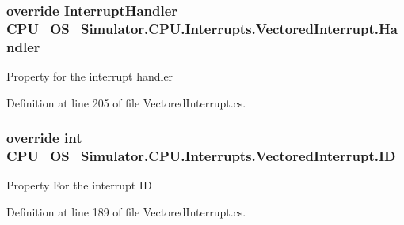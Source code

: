 \hypertarget{class_c_p_u___o_s___simulator_1_1_c_p_u_1_1_interrupts_1_1_vectored_interrupt_a0eb71f1e9f97cd4730fc8382e4ff8843}{}
\subsubsection[{Handler}]{\setlength{\rightskip}{0pt plus 5cm}override {\bf Interrupt\+Handler} C\+P\+U\+\_\+\+O\+S\+\_\+\+Simulator.\+C\+P\+U.\+Interrupts.\+Vectored\+Interrupt.\+Handler\hspace{0.3cm}{\ttfamily [get]}}\label{class_c_p_u___o_s___simulator_1_1_c_p_u_1_1_interrupts_1_1_vectored_interrupt_a0eb71f1e9f97cd4730fc8382e4ff8843}


Property for the interrupt handler 



Definition at line 205 of file Vectored\+Interrupt.\+cs.

\hypertarget{class_c_p_u___o_s___simulator_1_1_c_p_u_1_1_interrupts_1_1_vectored_interrupt_ae6afd6b3fba35d485a7504737ff90d23}{}
\subsubsection[{I\+D}]{\setlength{\rightskip}{0pt plus 5cm}override int C\+P\+U\+\_\+\+O\+S\+\_\+\+Simulator.\+C\+P\+U.\+Interrupts.\+Vectored\+Interrupt.\+I\+D\hspace{0.3cm}{\ttfamily [get]}}\label{class_c_p_u___o_s___simulator_1_1_c_p_u_1_1_interrupts_1_1_vectored_interrupt_ae6afd6b3fba35d485a7504737ff90d23}


Property For the interrupt I\+D 



Definition at line 189 of file Vectored\+Interrupt.\+cs.

